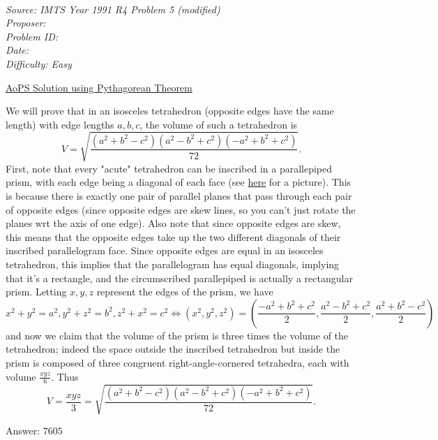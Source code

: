 \SSbreak\\
\emph{Source: IMTS Year 1991 R4 Problem 5 (modified)} \\
\emph{Proposer: \Pflame}\\ %
\emph{Problem ID:}\\
\emph{Date: }\\
\emph{Difficulty: Easy}\\
\SSbreak

\bigskip

\begin{solution}\hfil\medskip
	
	\href{https://artofproblemsolving.com/community/q2h54423p339658}{AoPS Solution using Pythagorean Theorem} \medskip

	We will prove that in an isosceles tetrahedron (opposite edges have the same length) with edge lengths $a, b, c$, the volume of such a tetrahedron is 
	$$V = \sqrt{\dfrac{\left(a^2 + b^2 - c^2\right)\left(a^2 - b^2 + c^2\right)\left(-a^2 + b^2 + c^2\right)}{72}}.$$
	First, note that every "acute" tetrahedron can be inscribed in a parallepiped prism, with each edge being a diagonal of each face (see \href{https://www.cut-the-knot.org/triangle/TetrahedronInParallelepiped.shtml}{here} for a picture). 
	This is because there is exactly one pair of parallel planes that pass through each pair of opposite edges 
	(since opposite edges are skew lines, so you can't just rotate the planes wrt the axis of one edge). 
	Also note that since opposite edges are skew, this means that the opposite edges take up the two different diagonals of their inscribed parallelogram face.
	Since opposite edges are equal in an isosceles tetrahedron, this implies that the parallelogram has equal diagonals, implying that it's a rectangle,
	and the circumscribed parallepiped is actually a rectangular prism. Letting $x, y, z$ represent the edges of the prism, we have
	$$x^2 + y^2 = a^2, y^2 + z^2 = b^2, z^2 + x^2 = c^2 \iff \left(x^2, y^2, z^2\right) = \left(\dfrac{-a^2 + b^2 + c^2}{2}, \dfrac{a^2 - b^2 + c^2}{2}, \dfrac{a^2 + b^2 - c^2}{2}\right)$$
	and now we claim that the volume of the prism is three times the volume of the tetrahedron; indeed the space outside the inscribed tetrahedron but inside the prism
	is composed of three congruent right-angle-cornered tetrahedra, each with volume $\frac{xyz}{6}$. 
	Thus $$V = \dfrac{xyz}{3} = \sqrt{\dfrac{\left(a^2 + b^2 - c^2\right)\left(a^2 - b^2 + c^2\right)\left(-a^2 + b^2 + c^2\right)}{72}}.$$
	
	Answer: \(\boxed{7605}\)
\end{solution}\bigskip
